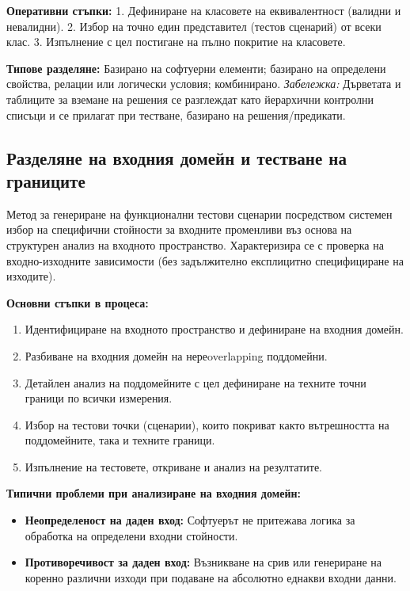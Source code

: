 \documentclass{scrartcl}
\begin{document}
\begin{FlushLeft}
\textbf{Оперативни стъпки:} 1. Дефиниране на класовете на еквивалентност (валидни и невалидни). 2. Избор на точно един представител (тестов сценарий) от всеки клас. 3. Изпълнение с цел постигане на пълно покритие на класовете.

\textbf{Типове разделяне:} Базирано на софтуерни елементи; базирано на определени свойства, релации или логически условия; комбинирано.
\textit{Забележка:} Дърветата и таблиците за вземане на решения се разглеждат като йерархични контролни списъци и се прилагат при тестване, базирано на решения/предикати.

\subsection{Разделяне на входния домейн и тестване на границите}
Метод за генериране на функционални тестови сценарии посредством системен избор на специфични стойности за входните променливи въз основа на структурен анализ на входното пространство. Характеризира се с проверка на входно-изходните зависимости (без задължително експлицитно специфициране на изходите).

\textbf{Основни стъпки в процеса:}
\begin{enumerate}
    \item Идентифициране на входното пространство и дефиниране на входния домейн.
    \item Разбиване на входния домейн на нереoverlapping поддомейни.
    \item Детайлен анализ на поддомейните с цел дефиниране на техните точни граници по всички измерения.
    \item Избор на тестови точки (сценарии), които покриват както вътрешността на поддомейните, така и техните граници.
    \item Изпълнение на тестовете, откриване и анализ на резултатите.
\end{enumerate}

\textbf{Типични проблеми при анализиране на входния домейн:}
\begin{itemize}
    \item \textbf{Неопределеност на даден вход:} Софтуерът не притежава логика за обработка на определени входни стойности.
    \item \textbf{Противоречивост за даден вход:} Възникване на срив или генериране на коренно различни изходи при подаване на абсолютно еднакви входни данни.
\end{itemize}


\end{FlushLeft}
\end{document}
